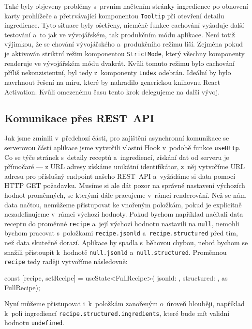 Také byly objeveny problémy s~prvním načtením stránky ingredience po obnovení karty prohlížeče a přetrvávající komponentou \texttt{Tooltip} při otevření detailu ingredience. Tyto situace byly ošetřeny, nicméně funkce cachování vyžaduje další testování a~to jak ve vývojářském, tak produkčním módu aplikace. Není totiž výjimkou, že se chování vývojářského a~produkčního režimu liší. Zejména pokud je aktivován striktní režim komponentou \texttt{StrictMode}, který všechny komponenty renderuje ve vývojářském módu dvakrát. Kvůli tomuto režimu bylo cachování příliš nekonzistentní, byl tedy z~komponenty \texttt{Index} odebrán. Ideální by bylo navrhnout řešení na míru, které by nahradilo generickou knihovnu React Activation. Kvůli omezenému času tento krok delegujeme na další vývoj.

\subsection{Komunikace přes REST~API}

Jak jsme zmínili v~předchozí části, pro zajištění asynchronní komunikace se serverovou částí aplikace jsme vytvořili vlastní Hook v~podobě funkce \texttt{useHttp}. Co se týče stránek s~detaily receptů a~ingrediencí, získání dat od serveru je přímočaré --- z URL adresy získáme unikátní identifikátor, z~něj vytvoříme URL adresu pro příslušný endpoint našeho REST~API a~vyžádáme si data pomocí HTTP GET požadavku. Musíme si ale dát pozor na správné nastavení výchozích hodnot proměnných, se kterými dále pracujeme v~rámci renderování. Než se nám data načtou, nemůžeme přistupovat ke vnořeným položkám, pokud je explicitně nezadefinujeme v~rámci výchozí hodnoty. Pokud bychom například načítali data receptu do proměnné \texttt{recipe} a~její výchozí hodnotu nastavili na \texttt{null}, nemohli bychom pracovat s~položkami \texttt{recipe.jsonld} a~\texttt{recipe.structured} před tím, než data skutečně dorazí. Aplikace by spadla s~běhovou chybou, neboť bychom se snažili přistoupit k~hodnotě \texttt{null.jsonld} a~\texttt{null.structured}. Proměnnou \texttt{recipe} tedy raději vytvoříme následovně:
\begingroup
\samepage
\begin{code}
const [recipe, setRecipe] = useState<FullRecipe>({
  jsonld: {},
  structured: {},
} as FullRecipe);
\end{code}
Nyní můžeme přistupovat i~k~položkám zanořeným o~úroveň hlouběji, například k~poli ingrediencí \texttt{recipe.structured.ingredients}, které bude mít validní hodnotu \texttt{undefined}.
\endgroup


